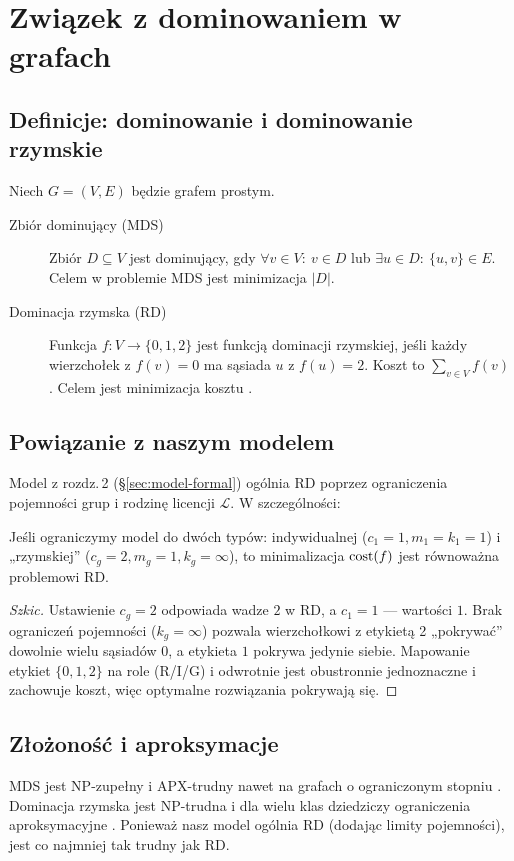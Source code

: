 \chapter{Związek z dominowaniem w grafach}

\section{Definicje: dominowanie i dominowanie rzymskie}
\noindent Niech $G=(V,E)$ będzie grafem prostym.
\begin{description}
  \item[Zbiór dominujący (MDS)] Zbiór $D\subseteq V$ jest dominujący, gdy $\forall v\in V:\ v\in D$ lub $\exists u\in D:\ \{u,v\}\in E$. Celem w problemie MDS jest minimizacja $|D|$.
  \item[Dominacja rzymska (RD)] Funkcja $f:V\to\{0,1,2\}$ jest funkcją dominacji rzymskiej, jeśli każdy wierzchołek z $f(v)=0$ ma sąsiada $u$ z $f(u)=2$. Koszt to $\sum_{v\in V} f(v)$. Celem jest minimizacja kosztu \cite{Cockayne2004,henning2013roman}.
\end{description}

\section{Powiązanie z naszym modelem}
\noindent Model z rozdz.\,2 (\S\ref{sec:model-formal}) ogólnia RD poprzez ograniczenia pojemności grup i rodzinę licencji $\mathcal{L}$. W szczególności:
\begin{theorem}
Jeśli ograniczymy model do dwóch typów: indywidualnej ($c_1=1, m_1=k_1=1$) i „rzymskiej” ($c_g=2, m_g=1, k_g=\infty$), to minimalizacja $\operatorname{cost}(f)$ jest równoważna problemowi RD.
\end{theorem}
\begin{proof}[Szkic]
Ustawienie $c_g=2$ odpowiada wadze $2$ w RD, a $c_1=1$ — wartości $1$. Brak ograniczeń pojemności ($k_g=\infty$) pozwala wierzchołkowi z etykietą 2 „pokrywać” dowolnie wielu sąsiadów $0$, a etykieta $1$ pokrywa jedynie siebie. Mapowanie etykiet $\{0,1,2\}$ na role (R/I/G) i odwrotnie jest obustronnie jednoznaczne i zachowuje koszt, więc optymalne rozwiązania pokrywają się.
\end{proof}

\section{Złożoność i aproksymacje}
\noindent MDS jest NP-zupełny i APX-trudny nawet na grafach o ograniczonym stopniu \cite{ALIMONTI2000123,chlebik2008}. Dominacja rzymska jest NP-trudna \cite{chambers2009} i dla wielu klas dziedziczy ograniczenia aproksymacyjne \cite{POUREIDI2023106363}. Ponieważ nasz model ogólnia RD (dodając limity pojemności), jest co najmniej tak trudny jak RD.

